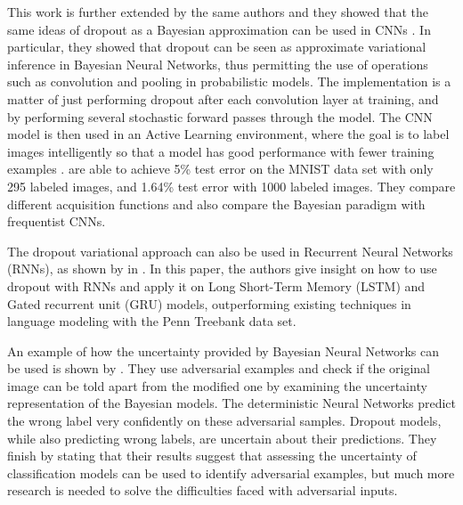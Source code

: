 This work is further extended by the same authors and they showed that the same ideas of dropout as a Bayesian approximation can be used in CNNs \cite{gal2015bayesian}. In particular, they showed that dropout can be seen as approximate variational inference in Bayesian Neural Networks, thus permitting the use of operations such as convolution and pooling in probabilistic models. The implementation is a matter of just performing dropout after each convolution layer at training, and by performing several stochastic forward passes through the model. The CNN model is then used in an Active Learning environment, where the goal is to label images intelligently so that a model has good performance with fewer training examples \cite{Gal2016Active}. \citeauthor{Gal2016Active} \cite{Gal2016Active} are able to achieve 5\% test error on the MNIST data set \cite{lecun1998gradient} with only 295 labeled images, and 1.64\% test error with 1000 labeled images. They compare different acquisition functions and also compare the Bayesian paradigm with frequentist CNNs.

The dropout variational approach can also be used in Recurrent Neural Networks (RNNs), as shown by \citeauthor{gal2016theoretically} in \cite{gal2016theoretically}. In this paper, the authors give insight on how to use dropout with RNNs and apply it on Long Short-Term Memory (LSTM) and Gated recurrent unit (GRU) models, outperforming existing techniques in language modeling with the Penn Treebank data set.

An example of how the uncertainty provided by Bayesian Neural Networks can be used is shown by \citeauthor{li2017dropout} \cite{li2017dropout}. They use adversarial examples and check if the original image can be told apart from the modified one by examining the uncertainty representation of the Bayesian models. The deterministic Neural Networks predict the wrong label very confidently on these adversarial samples. Dropout models, while also predicting wrong labels, are uncertain about their predictions. They finish by stating that their results suggest that assessing the uncertainty of classification models can be used to identify adversarial examples, but much more research is needed to solve the difficulties faced with adversarial inputs.


